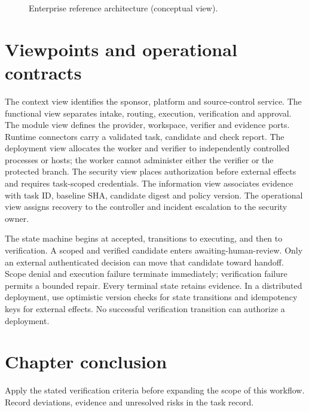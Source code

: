 \begin{figure}[htbp]\centering\caption{Enterprise reference architecture (conceptual view).}\label{fig:d23}\end{figure}

\section{Viewpoints and operational contracts}
The context view identifies the sponsor, platform and source-control service. The functional view separates intake, routing, execution, verification and approval. The module view defines the provider, workspace, verifier and evidence ports. Runtime connectors carry a validated task, candidate and check report. The deployment view allocates the worker and verifier to independently controlled processes or hosts; the worker cannot administer either the verifier or the protected branch. The security view places authorization before external effects and requires task-scoped credentials. The information view associates evidence with task ID, baseline SHA, candidate digest and policy version. The operational view assigns recovery to the controller and incident escalation to the security owner.

The state machine begins at accepted, transitions to executing, and then to verification. A scoped and verified candidate enters awaiting-human-review. Only an external authenticated decision can move that candidate toward handoff. Scope denial and execution failure terminate immediately; verification failure permits a bounded repair. Every terminal state retains evidence. In a distributed deployment, use optimistic version checks for state transitions and idempotency keys for external effects. No successful verification transition can authorize a deployment.

\section{Chapter conclusion}

Apply the stated verification criteria before expanding the scope of this workflow. Record deviations, evidence and unresolved risks in the task record.
